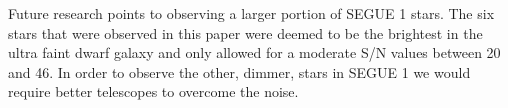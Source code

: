 \documentclass{aastex631}
\begin{document}
Future research points to observing a larger portion of SEGUE 1 stars. The six stars that were observed in this paper were deemed to
be the brightest in the ultra faint dwarf galaxy and only allowed for a moderate S/N values between 20 and 46. In order to observe the other, dimmer,
stars in SEGUE 1 we would require better telescopes to overcome the noise.


\nocite{*}
{}



\end{document}
